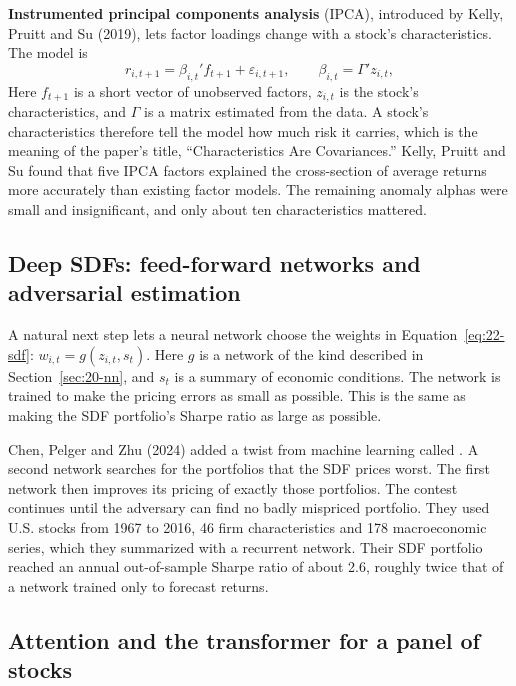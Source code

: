 \textbf{Instrumented principal components analysis} (IPCA), introduced by Kelly, Pruitt and Su (2019), lets factor loadings change with a stock's characteristics. The model is
\begin{equation}
  r_{i,t+1} = \beta_{i,t}' f_{t+1} + \varepsilon_{i,t+1}, \qquad \beta_{i,t} = \Gamma' z_{i,t},
  \label{eq:22-ipca}
\end{equation}
Here $f_{t+1}$ is a short vector of unobserved factors, $z_{i,t}$ is the stock's characteristics, and $\Gamma$ is a matrix estimated from the data. A stock's characteristics therefore tell the model how much risk it carries, which is the meaning of the paper's title, ``Characteristics Are Covariances.'' Kelly, Pruitt and Su found that five IPCA factors explained the cross-section of average returns more accurately than existing factor models. The remaining anomaly alphas were small and insignificant, and only about ten characteristics mattered.

\subsection{Deep SDFs: feed-forward networks and adversarial estimation}

A natural next step lets a neural network choose the weights in Equation~\eqref{eq:22-sdf}: $w_{i,t} = g(z_{i,t}, s_t)$. Here $g$ is a network of the kind described in Section~\ref{sec:20-nn}, and $s_t$ is a summary of economic conditions. The network is trained to make the pricing errors as small as possible. This is the same as making the SDF portfolio's Sharpe ratio as large as possible.

Chen, Pelger and Zhu (2024) added a twist from machine learning called . A second network searches for the portfolios that the SDF prices worst. The first network then improves its pricing of exactly those portfolios. The contest continues until the adversary can find no badly mispriced portfolio. They used U.S. stocks from 1967 to 2016, 46 firm characteristics and 178 macroeconomic series, which they summarized with a recurrent network. Their SDF portfolio reached an annual out-of-sample Sharpe ratio of about 2.6, roughly twice that of a network trained only to forecast returns.

\subsection{Attention and the transformer for a panel of stocks}

